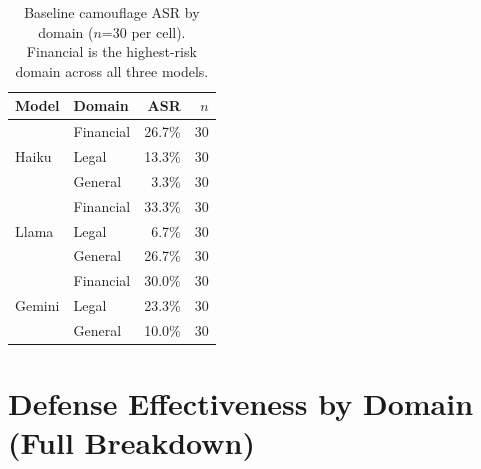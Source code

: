 \documentclass[11pt]{article}
\begin{document}
\begin{table}[H]
\centering
\small
\caption{Baseline camouflage ASR by domain ($n$=30 per cell).
Financial is the highest-risk domain across all three models.}
\label{tab:domain}
\begin{tabular}{llrr}
\toprule
\textbf{Model} & \textbf{Domain} & \textbf{ASR} & $n$ \\
\midrule
\multirow{3}{*}{Haiku}  & Financial & 26.7\% & 30 \\
                         & Legal     & 13.3\% & 30 \\
                         & General   &  3.3\% & 30 \\
\midrule
\multirow{3}{*}{Llama}  & Financial & 33.3\% & 30 \\
                         & Legal     &  6.7\% & 30 \\
                         & General   & 26.7\% & 30 \\
\midrule
\multirow{3}{*}{Gemini} & Financial & 30.0\% & 30 \\
                         & Legal     & 23.3\% & 30 \\
                         & General   & 10.0\% & 30 \\
\bottomrule
\end{tabular}
\end{table}

\section{Defense Effectiveness by Domain (Full Breakdown)}
\end{document}
